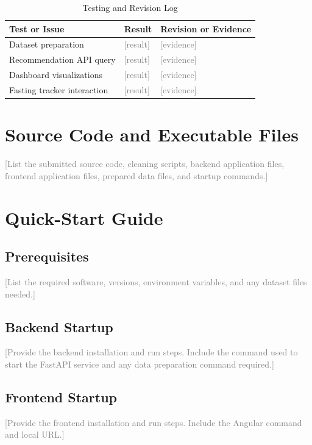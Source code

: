 \documentclass[12pt]{report}
\newcommand{\placeholder}[1]{\textcolor{gray}{[#1]}}
\begin{document}
\begin{table}[H]
    \centering
    \caption{Testing and Revision Log}
    \begin{tabular}{p{} p{} p{}}
        \toprule
        Test or Issue & Result & Revision or Evidence \\
        \midrule
        Dataset preparation & \placeholder{result} & \placeholder{evidence} \\
        Recommendation API query & \placeholder{result} & \placeholder{evidence} \\
        Dashboard visualizations & \placeholder{result} & \placeholder{evidence} \\
        Fasting tracker interaction & \placeholder{result} & \placeholder{evidence} \\
        \bottomrule
    \end{tabular}
\end{table}

\section{Source Code and Executable Files}
\placeholder{List the submitted source code, cleaning scripts, backend application files, frontend application files, prepared data files, and startup commands.}

\section{Quick-Start Guide}
\subsection{Prerequisites}
\placeholder{List the required software, versions, environment variables, and any dataset files needed.}

\subsection{Backend Startup}
\placeholder{Provide the backend installation and run steps. Include the command used to start the FastAPI service and any data preparation command required.}

\subsection{Frontend Startup}
\placeholder{Provide the frontend installation and run steps. Include the Angular command and local URL.}
\end{document}
